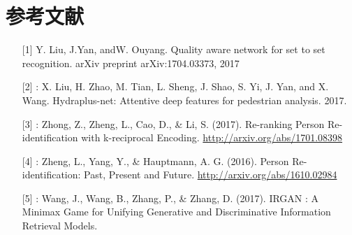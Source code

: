 {
\renewcommand{\chapter}[2]{\section*{#2}\addcontentsline{toc}{section}{#2}}
\section{参考文献}
}

\begin{itemize}
\item [{[}1{]}] Y. Liu, J.Yan, andW. Ouyang. Quality aware network for set to set recognition. arXiv preprint arXiv:1704.03373, 2017
\item [{[}2{]}]: X. Liu, H. Zhao, M. Tian, L. Sheng, J. Shao, S. Yi, J. Yan, and X. Wang. Hydraplus-net: Attentive deep features for pedestrian analysis. 2017.
\item [{[}3{]}]: Zhong, Z., Zheng, L., Cao, D., \& Li, S. (2017). Re-ranking Person Re-identification with k-reciprocal Encoding. \url{http://arxiv.org/abs/1701.08398}
\item [{[}4{]}]: Zheng, L., Yang, Y., \& Hauptmann, A. G. (2016). Person Re-identification: Past, Present and Future. \url{http://arxiv.org/abs/1610.02984}
\item [{[}5{]}]: Wang, J., Wang, B., Zhang, P., \& Zhang, D. (2017). IRGAN : A Minimax Game for Unifying Generative and Discriminative Information Retrieval Models.
\end{itemize}


% 
% 

